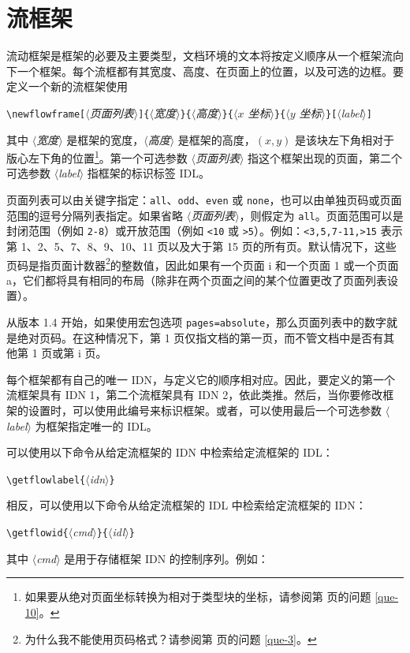 \documentclass[a4paper]{book}%
\newcommand{\meta}[1]{\textnormal{\ensuremath{\langle}\makebox[0pt][l]{}\emph{#1}\makebox[0pt][l]{}\ensuremath{\rangle}}}
\newcommand{\cmd}[1]{\texttt{#1}}
\begin{document}
\section{流框架}%
流动框架是框架的必要及主要类型，文档环境的文本将按定义顺序从一个框架流向下一个框架。每个流框都有其宽度、高度、在页面上的位置，以及可选的边框。要定义一个新的流框架使用
\begin{mdframed}
\verb|\newflowframe[|\meta{页面列表}\verb|]{|\meta{宽度}\verb|}{|\meta{高度}\verb|}{|\meta{$x$ 坐标}\verb|}{|\meta{$y$ 坐标}\verb|}[|\meta{label}\verb|]|
\end{mdframed}
其中 \meta{宽度} 是框架的宽度，\meta{高度} 是框架的高度，$(x, y)$ 是该块左下角相对于版心左下角的位置\footnote{如果要从绝对页面坐标转换为相对于类型块的坐标，请参阅第 \pageref{page-que-10} 页的问题 \ref{que-10}。}。第一个可选参数 \meta{页面列表} 指这个框架出现的页面，第二个可选参数 \meta{label} 指框架的标识标签 IDL。

页面列表可以由关键字指定：\cmd{all}、\cmd{odd}、\cmd{even} 或 \cmd{none}，也可以由单独页码或页面范围的逗号分隔列表指定。如果省略 \meta{页面列表}，则假定为 \cmd{all}。页面范围可以是封闭范围（例如 \cmd{2-8}）或开放范围（例如 \cmd{<10} 或 \cmd{>5}）。例如：\cmd{<3,5,7-11,>15} 表示第 1、2、5、7、8、9、10、11 页以及大于第 15 页的所有页。默认情况下，这些页码是指页面计数器\footnote{为什么我不能使用页码格式？请参阅第 \pageref{page-que-3} 页的问题 \ref{que-3}。}的整数值，因此如果有一个页面 i 和一个页面 1 或一个页面 a，它们都将具有相同的布局（除非在两个页面之间的某个位置更改了页面列表设置）。

从版本 1.4 开始，如果使用宏包选项 \cmd{pages=absolute}，那么页面列表中的数字就是绝对页码。在这种情况下，第 1 页仅指文档的第一页，而不管文档中是否有其他第 1 页或第 i 页。

每个框架都有自己的唯一 IDN，与定义它的顺序相对应。因此，要定义的第一个流框架具有 IDN 1，第二个流框架具有 IDN 2，依此类推。然后，当你要修改框架的设置时，可以使用此编号来标识框架。或者，可以使用最后一个可选参数 \meta{label} 为框架指定唯一的 IDL。

可以使用以下命令从给定流框架的 IDN 中检索给定流框架的 IDL：
\begin{mdframed}
\verb|\getflowlabel{|\meta{idn}\verb|}|
\end{mdframed}
相反，可以使用以下命令从给定流框架的 IDL 中检索给定流框架的 IDN：
\begin{mdframed}
\verb|\getflowid{|\meta{cmd}\verb|}{|\meta{idl}\verb|}|
\end{mdframed}
其中 \meta{cmd} 是用于存储框架 IDN 的控制序列。例如：\vspace*{7pt}
\end{document}
